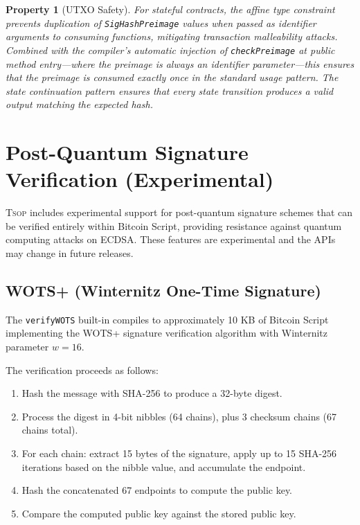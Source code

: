 \documentclass[11pt,a4paper]{article}
\newtheorem{property}[theorem]{Property}
\newcommand{\tsop}{\textsc{Tsop}}
\begin{document}
\begin{property}[UTXO Safety]
\label{prop:utxo-safety}
For stateful contracts, the affine type constraint prevents duplication
of \texttt{SigHashPreimage} values when passed as identifier arguments
to consuming functions, mitigating transaction malleability attacks.
Combined with the compiler's automatic injection of \texttt{checkPreimage}
at public method entry---where the preimage is always an identifier
parameter---this ensures that the preimage is consumed exactly once in
the standard usage pattern. The state continuation pattern ensures that
every state transition produces a valid output matching the expected hash.
\end{property}

\section{Post-Quantum Signature Verification (Experimental)}
\label{sec:pq}

\tsop{} includes experimental support for post-quantum signature schemes
that can be verified entirely within Bitcoin Script, providing resistance
against quantum computing attacks on ECDSA. These features are experimental
and the APIs may change in future releases.

\subsection{WOTS+ (Winternitz One-Time Signature)}
\label{sec:wots}

The \texttt{verifyWOTS} built-in compiles to approximately 10 KB of Bitcoin
Script implementing the WOTS+ signature verification algorithm with
Winternitz parameter $w = 16$.

The verification proceeds as follows:
\begin{enumerate}[nosep]
  \item Hash the message with SHA-256 to produce a 32-byte digest.
  \item Process the digest in 4-bit nibbles (64 chains), plus 3 checksum
    chains (67 chains total).
  \item For each chain: extract 15 bytes of the signature, apply up to 15
    SHA-256 iterations based on the nibble value, and accumulate the endpoint.
  \item Hash the concatenated 67 endpoints to compute the public key.
  \item Compare the computed public key against the stored public key.
\end{enumerate}
\end{document}
